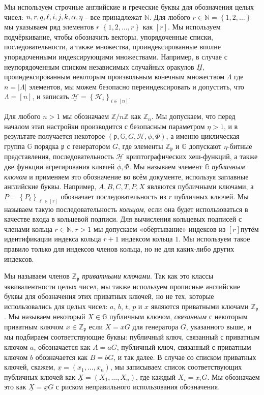 \documentclass{mrl}
\theoremstyle{definition}
\numberwithin{theorem}{subsection}
\newcommand{\scalarField}{\mathbb{Z}_{\mathfrak{p}}}
\newcommand{\bbz}{\mathbb{Z}}
\newcommand{\bbn}{\mathbb{N}}
\newcommand{\group}{\mathbb{G}}
\newcommand{\p}{\mathfrak{p}}
\begin{document}
Мы используем строчные английские и греческие буквы для обозначения целых чисел: $n, r, q, \ell, i, j, k, \linebreak \alpha, \eta$ - все принадлежат $\bbn$. Для любого $r \in \bbn = \left\{1, 2, \ldots\right\}$мы указываем ряд элементов $r$ $\left\{1, 2, \ldots, r\right\}$ как $\left[r\right]$. Мы используем подчёркивание, чтобы обозначить векторы, упорядоченные списки, последовательности, а также множества, проиндексированные вполне упорядоченными индексирующими множествами. Например, в случае с неупорядоченным списком независимых случайных оракулов $\underline{H}$, проиндексированным некоторым произвольным конечным множеством $\Lambda$ где $n = \left|\Lambda\right|$ элементов, мы можем безопасно переиндексировать и допустить, что $\Lambda = [n]$, и записать $\underline{\mathcal{H}} = \left\{\mathcal{H}_i\right\}_{i \in [n]}$.

Для любого $n > 1$ мы обозначаем $\bbz/n\bbz$ как $\bbz_n$. Мы допускаем, что перед началом этап настройки производится с безопасным параметром $\eta > 1$, и в результате получается некоторое $(\p, \group, G, \underline{\mathcal{H}}, \phi, \Phi)$, а именно циклическая группа $\group$ порядка $\p$ с генератором $G$, где элементы $\bbz_\p$ и $\mathbb{G}$ допускают $\eta$-битные представления, последовательность $\underline{\mathcal{H}}$ криптографических хеш-функций, а также две функции агрегирования ключей $\phi, \Phi$. Мы называем элемент $\group$ \textit{публичным ключом} и применяем это обозначение во всём документе, используя заглавные английские буквы. Например, $A, B, C, T, P, X$ являются публичными ключами, а $\underline{P} = \left\{P_\ell \right\}_{\ell \in [r]}$ обозначает последовательность из $r$ публичных ключей. Мы называем такую последовательность \textit{кольцом}, если она будет использоваться в качестве входа в кольцевой подписи. Для вычисления кольцевых подписей с членами кольца $r \in \bbn, r > 1$ мы допускаем «обёртывание» индексов из $[r]$путём идентификации индекса кольца $r+1$ индексом кольца $1$. Мы используем такое правило только для индексов членов кольца, но не для каких-либо других индексов.

Мы называем членов $\scalarField$ \textit{приватными ключами}. Так как это классы эквивалентности целых чисел, мы также используем прописные английские буквы для обозначения этих приватных ключей, но не тех, которые использовались для целых чисел: $a$, $b$, $t$, $p$ и $x$ являются приватными ключами $\scalarField$. Мы называем некоторый $X \in \group$ публичным ключом, \textit{связанным} с некоторым приватным ключом $x \in \scalarField$ если $X = xG$ для генератора $G$, указанного выше, и мы подбираем соответствующие буквы: публичный ключ, связанный с приватным ключом $a$, обозначается как $A = aG$, публичный ключ, связанный с приватным ключом $b$ обозначается как $B = bG$, и так далее. В случае со списком приватных ключей, скажем, $\underline{x} = (x_1, \ldots, x_n)$, мы записываем список соответствующих публичных ключей как $\underline{X} = (X_1, \ldots, X_n)$, где каждый $X_i = x_i G$. Мы обозначаем это как $\underline{X} = \underline{x}G$ с риском неправильного использования обозначения.
\end{document}
